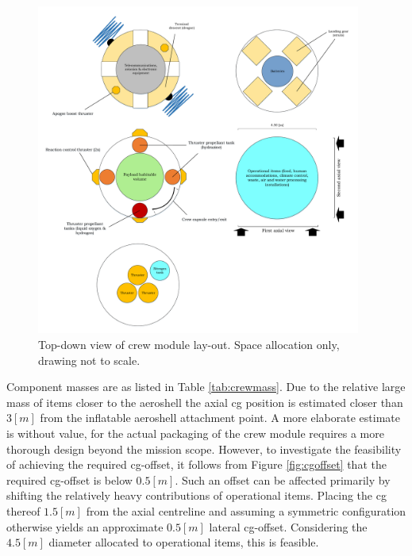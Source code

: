 \begin{figure}[h]
		\centering
		\includegraphics[width=0.95\textwidth]{./Figure/CrewModule/TopviewV2.pdf}
		\caption[Top-down view of crew module lay-out]{Top-down view of crew module lay-out. Space allocation only, drawing not to scale.}
		\label{fig:topview}
\end{figure}

Component masses are as listed in Table \ref{tab:crewmass}. Due to the relative large mass of items closer to the aeroshell the axial \gls{cg} position is estimated closer than $3 \left[m\right]$ from the inflatable aeroshell attachment point. A more elaborate estimate is without value, for the actual packaging of the crew module requires a more thorough design beyond the mission scope. However, to investigate the feasibility of achieving the required \gls{cg}-offset, it follows from Figure \ref{fig:cgoffset} that the required \gls{cg}-offset is below $0.5 \left[m\right]$. Such an offset can be affected primarily by shifting the relatively heavy contributions of operational items. Placing the \gls{cg} thereof $1.5 \left[m\right]$ from the axial centreline and assuming a symmetric configuration otherwise yields an approximate $0.5 \left[m\right]$ lateral \gls{cg}-offset. Considering the $4.5 \left[m\right]$ diameter allocated to operational items, this is feasible. %

